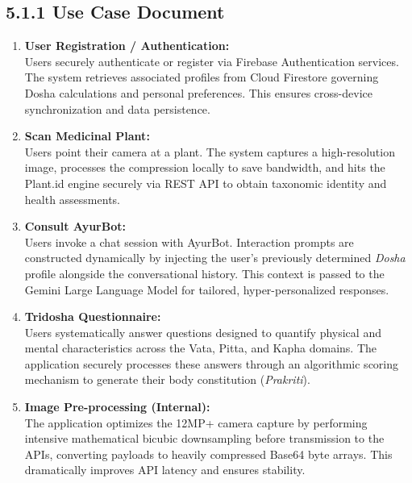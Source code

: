 \documentclass[12pt]{article}
\begin{document}
\subsection*{5.1.1 \quad Use Case Document}
\begin{enumerate}
    \item \textbf{User Registration / Authentication:}\\
    Users securely authenticate or register via Firebase Authentication services. The system
    retrieves associated profiles from Cloud Firestore governing Dosha calculations and personal
    preferences. This ensures cross-device synchronization and data persistence.

    \item \textbf{Scan Medicinal Plant:}\\
    Users point their camera at a plant. The system captures a high-resolution image, processes the
    compression locally to save bandwidth, and hits the Plant.id engine securely via REST API to
    obtain taxonomic identity and health assessments.

    \item \textbf{Consult AyurBot:}\\
    Users invoke a chat session with AyurBot. Interaction prompts are constructed dynamically by
    injecting the user's previously determined \textit{Dosha} profile alongside the conversational
    history. This context is passed to the Gemini Large Language Model for tailored,
    hyper-personalized responses.

    \item \textbf{Tridosha Questionnaire:}\\
    Users systematically answer questions designed to quantify physical and mental characteristics
    across the Vata, Pitta, and Kapha domains. The application securely processes these answers
    through an algorithmic scoring mechanism to generate their body constitution (\textit{Prakriti}).

    \item \textbf{Image Pre-processing (Internal):}\\
    The application optimizes the 12MP+ camera capture by performing intensive mathematical bicubic
    downsampling before transmission to the APIs, converting payloads to heavily compressed Base64
    byte arrays. This dramatically improves API latency and ensures stability.
\end{enumerate}

\newpage
\end{document}
